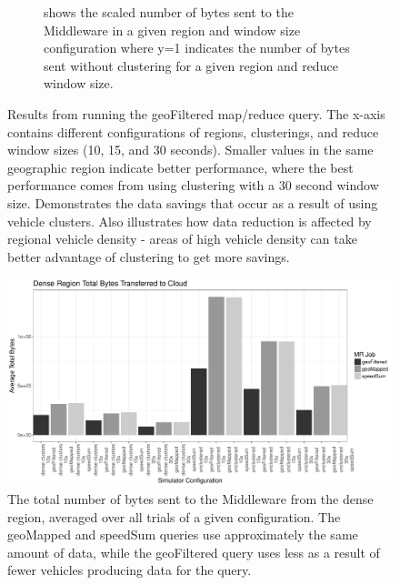 \documentclass{thesis}
\begin{document}
\begin{figure}
\begin{subfigure}[h]{0.45\textwidth}
            \caption{shows the scaled number of bytes sent to the Middleware in a given region and window size
            configuration where y=1 indicates the number of bytes sent without clustering for a given region
            and reduce window size.}
        \end{subfigure}
        \caption{Results from running the geoFiltered map/reduce query. The x-axis contains different
            configurations of regions, clusterings, and reduce window sizes (10, 15, and 30 seconds). Smaller
            values in the same geographic region indicate better performance, where the best performance
            comes from using clustering with a 30 second window size. Demonstrates the data savings that occur as a result of using
            vehicle clusters. Also illustrates how data reduction is affected by regional vehicle
            density - areas of high vehicle density can take better advantage of clustering to get more savings.}
            \label{results:geofiltered}
    \end{figure}

    \begin{figure}
            \includegraphics[width=\textwidth]{binImages/denseConfigs.pdf}
            \caption{The total number of bytes sent to the Middleware from the dense region, averaged over all trials of a given configuration.
                The geoMapped and speedSum queries use approximately the same amount of data, while the geoFiltered
                query uses less as a result of fewer vehicles producing data for the query.}
            \label{results:denseconfigs}
    \end{figure}
\end{document}
